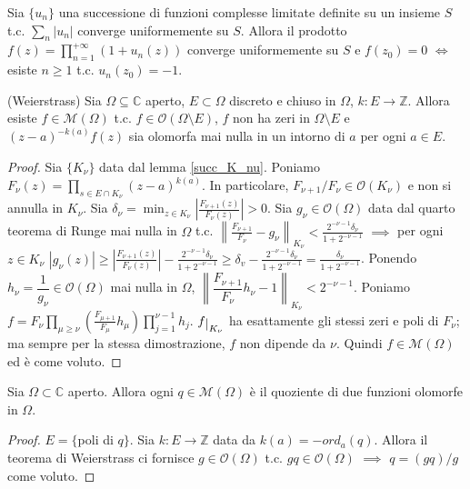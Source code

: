 \begin{exc}
  Sia $\{u_n\}$ una successione di funzioni complesse limitate definite su un insieme $S$ t.c. $\displaystyle \sum_{n} |u_n|$ converge uniformemente su $S$. Allora il prodotto $\displaystyle f(z)=\prod_{n=1}^{+\infty} (1+u_n(z))$ converge uniformemente su $S$ e $f(z_0)=0$ $\iff$ esiste $n \ge 1$ t.c. $u_n(z_0)=-1$.
\end{exc}

\begin{thm}
  (Weierstrass) Sia $\Omega \subseteq \mathbb{C}$ aperto, $E \subset \Omega$ discreto e chiuso in $\Omega$, $k:E \longrightarrow \mathbb{Z}$. Allora esiste $f \in \mathcal{M}(\Omega)$ t.c. $f \in \mathcal{O}(\Omega \setminus E)$, $f$ non ha zeri in $\Omega \setminus E$ e $(z-a)^{-k(a)}f(z)$ sia olomorfa mai nulla in un intorno di $a$ per ogni $a \in E$.
\end{thm}

\begin{proof}
  Sia $\{K_{\nu}\}$ data dal lemma \ref{succ_K_nu}. Poniamo $\displaystyle F_{\nu}(z)=\prod_{s \in E \cap K_{\nu}} (z-a)^{k(a)}$. In particolare, $F_{\nu+1}/F_{\nu} \in \mathcal{O}(K_{\nu})$ e non si annulla in $K_{\nu}$.
  Sia $\displaystyle \delta_{\nu}=\min_{z \in K_{\nu}} \left|\frac{F_{\nu+1}(z)}{F_{\nu}(z)}\right|>0$.
  Sia $g_{\nu} \in \mathcal{O}(\Omega)$ data dal quarto teorema di Runge mai nulla in $\Omega$ t.c. $\displaystyle \left\|\frac{F_{\nu+1}}{F_{\nu}}-g_{\nu}\right\|_{K_{\nu}}<\frac{2^{-\nu-1}\delta_{\nu}}{1+2^{-\nu-1}}$
  $\implies$ per ogni $z \in K_{\nu}$ $\displaystyle |g_{\nu}(z)| \ge \left|\frac{F_{\nu+1}(z)}{F_{\nu}(z)}\right|-\frac{2^{-\nu-1}\delta_{\nu}}{1+2^{-\nu-1}} \ge \delta_v-\frac{2^{-\nu-1}\delta_{\nu}}{1+2^{-\nu-1}}=\frac{\delta_{\nu}}{1+2^{-\nu-1}}$.
  Ponendo $h_{\nu}=\dfrac{1}{g_{\nu}} \in \mathcal{O}(\Omega)$ mai nulla in $\Omega$, $\left \|\dfrac{F_{\nu+1}}{F_{\nu}}h_{\nu}-1\right\|_{K_{\nu}}<2^{-\nu-1}$.
  Poniamo $\displaystyle f=F_{\nu}\prod_{\mu\ge\nu}\left(\frac{F_{\mu+1}}{F_{\mu}}h_{\mu}\right) \prod_{j=1}^{\nu-1}h_j$. $f\restrict{K_{\nu}}$ ha esattamente gli stessi zeri e poli di $F_{\nu}$; ma sempre per la stessa dimostrazione, $f$ non dipende da $\nu$. Quindi $f \in \mathcal{M}(\Omega)$ ed è come voluto.
\end{proof}

\begin{cor}
  Sia $\Omega \subset \mathbb{C}$ aperto. Allora ogni $q \in \mathcal{M}(\Omega)$ è il quoziente di due funzioni olomorfe in $\Omega$.
\end{cor}

\begin{proof}
  $E=\{$poli di $q\}$. Sia $k:E \longrightarrow \mathbb{Z}$ data da $k(a)=-ord_a(q)$. Allora il teorema di Weierstrass ci fornisce $g \in \mathcal{O}(\Omega)$ t.c. $gq \in \mathcal{O}(\Omega)$ $\implies$ $q=(gq)/g$ come voluto.
\end{proof}
